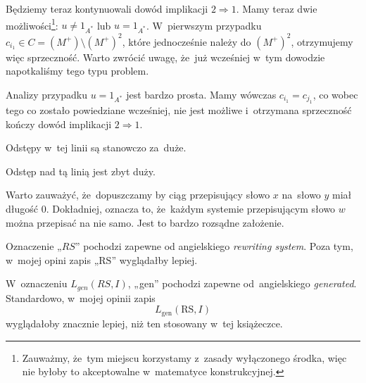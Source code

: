 \documentclass[a4paper,11pt]{article}
\begin{document}
Będziemy teraz kontynuowali dowód implikacji $2 \Rightarrow 1$. Mamy teraz dwie
możliwości\footnote{Zauważmy, że~tym miejscu korzystamy z~zasady
  wyłączonego środka, więc nie byłoby to akceptowalne w~matematyce
  konstrukcyjnej.}: $u \neq 1_{ A^{ * } }$ lub $u = 1_{ A^{ * } }$. W~pierwszym
przypadku $c_{ i_{ 1 } } \in C = ( M^{ + } ) \setminus ( M^{ + } )^{ 2 }$, które
jednocześnie należy do $( M^{ + } )^{ 2 }$, otrzymujemy więc sprzeczność.
Warto zwrócić uwagę, że~już wcześniej w~tym dowodzie napotkaliśmy tego typu
problem.

Analizy przypadku $u = 1_{ A^{ * } }$ jest bardzo prosta. Mamy wówczas
$c_{ i _{ 1 } } = c_{ j_{ 1 } }$, co wobec tego co zostało powiedziane
wcześniej, nie jest możliwe i~otrzymana sprzeczność kończy dowód implikacji
$2 \Rightarrow 1$.

\vspace{\spaceFour}





 Odstępy w~tej linii są stanowczo za~duże.

\vspace{\spaceFour}





 Odstęp nad tą linią jest zbyt duży.

\vspace{\spaceFour}





 Warto zauważyć, że~dopuszczamy by ciąg przepisujący słowo
$x$ na~słowo $y$ miał długość 0. Dokładniej, oznacza to, że~każdym systemie
przepisującym słowo $w$ można przepisać na nie samo. Jest to bardzo rozsądne
założenie.

\vspace{\spaceFour}





 Oznaczenie „$RS$” pochodzi zapewne od angielskiego
\textit{rewriting system}. Poza tym, w~mojej opini zapis „$\textrm{RS}$”
wyglądałby lepiej.

\vspace{\spaceFour}





 W~oznaczeniu $L_{ gen }( RS, I )$, „gen” pochodzi zapewne
od~angielskiego \textit{generated}. Standardowo, w~mojej opinii zapis
\begin{equation}
  \label{eq:Forys-Forys-79}
  L_{ \textrm{gen} }( \textrm{RS}, I )
\end{equation}
wyglądałoby znacznie lepiej, niż ten stosowany w~tej książeczce.
\end{document}
